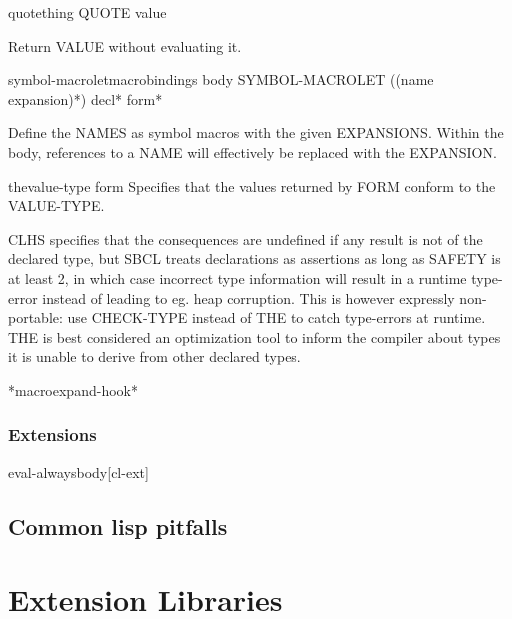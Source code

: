 \documentclass[10pt,english]{book}
\begin{document}
\begin{specialop}{quote}{thing}
  QUOTE value

Return VALUE without evaluating it.
\end{specialop}

\begin{specialop}{symbol-macrolet}{macrobindings \body body}
  SYMBOL-MACROLET ({(name expansion)}*) decl* form*

Define the NAMES as symbol macros with the given EXPANSIONS. Within the
body, references to a NAME will effectively be replaced with the EXPANSION.
\end{specialop}

\begin{specialop}{the}{value-type form}
  Specifies that the values returned by FORM conform to the VALUE-TYPE.

CLHS specifies that the consequences are undefined if any result is
not of the declared type, but SBCL treats declarations as assertions
as long as SAFETY is at least 2, in which case incorrect type
information will result in a runtime type-error instead of leading to
eg. heap corruption. This is however expressly non-portable: use
CHECK-TYPE instead of THE to catch type-errors at runtime. THE is best
considered an optimization tool to inform the compiler about types it
is unable to derive from other declared types.
\end{specialop}

\begin{variable}{*macroexpand-hook*}{}
  
\end{variable}

\section{Extensions}
\label{sec:extensions}

\begin{macro}{eval-always}{\body body}[cl-ext]
  
\end{macro}




\chapter{Common lisp pitfalls}




\part{Extension Libraries}
\label{part:libraries}
\end{document}
